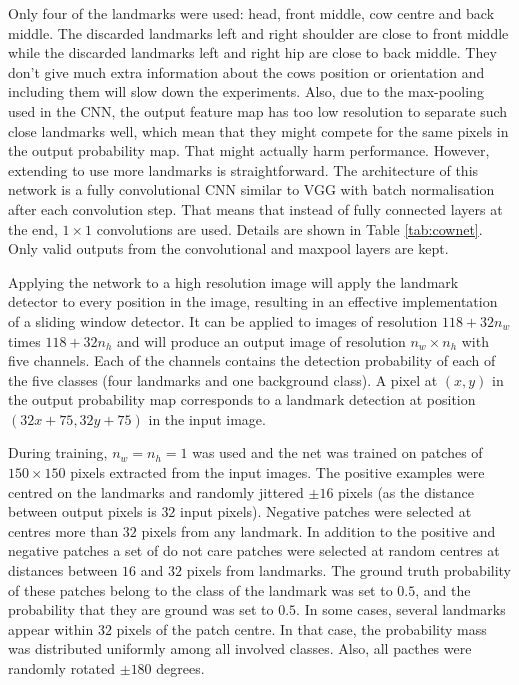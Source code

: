 \documentclass{cta-author}
\begin{document}
Only four of the landmarks were used: head, front middle, cow centre and back middle.
The discarded landmarks left and right shoulder are close to front middle while the discarded landmarks left
and right hip are close to back middle. They don't give much extra information about the cows position or
orientation and including them will slow down the experiments. Also, due to the max-pooling used in the CNN,
the output feature map has too low resolution to separate such close landmarks well, which mean that they
might compete for the same pixels in the output probability map. That might actually harm performance.
However, extending to use more landmarks is straightforward. The architecture of this network is a fully
convolutional CNN similar to VGG \cite{Simonyan14c} with batch normalisation
\cite{DBLP:journals/corr/IoffeS15} after each convolution step. That means that instead of fully connected
layers at the end, $1 \times 1$ convolutions are used. Details are shown in Table \ref{tab:cownet}. Only
valid outputs from the convolutional and maxpool layers are kept.

Applying the network to a high resolution image will apply the landmark detector to every position in the
image, resulting in an effective implementation of a sliding window detector. It can be applied to images of
resolution $118 + 32 n_w$ times $118 + 32 n_h$ and will produce an output image of resolution $n_w \times
n_h$ with five channels. Each of the channels contains the detection probability of each of the five classes
(four landmarks and one background class). A pixel at $\left(x, y\right)$ in the output probability map
corresponds to a landmark detection at position $\left(32 x + 75, 32 y + 75\right)$ in the input image.

During training, $n_w = n_h = 1$ was used and the net was trained on patches of $150\times 150$ pixels
extracted from the input images. The positive examples were centred on the landmarks and randomly jittered
$\pm 16$ pixels (as the distance between output pixels is $32$ input pixels). Negative patches were selected
at centres more than $32$ pixels from any landmark. In addition to the positive and negative patches a set of
do not care patches were selected at random centres at distances between $16$ and $32$ pixels from landmarks.
The ground truth probability of these patches belong to the class of the landmark was set to $0.5$, and the
probability that they are ground was set to $0.5$. In some cases, several landmarks appear within $32$ pixels
of the patch centre. In that case, the probability mass was distributed uniformly among all involved classes.
Also, all pacthes were randomly rotated $\pm 180$ degrees.
\end{document}
